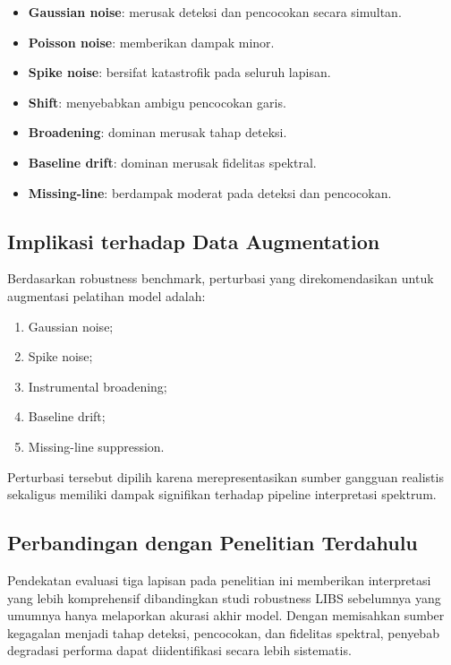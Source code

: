 \begin{itemize}
    \item \textbf{Gaussian noise}: merusak deteksi dan pencocokan secara simultan.
    \item \textbf{Poisson noise}: memberikan dampak minor.
    \item \textbf{Spike noise}: bersifat katastrofik pada seluruh lapisan.
    \item \textbf{Shift}: menyebabkan ambigu pencocokan garis.
    \item \textbf{Broadening}: dominan merusak tahap deteksi.
    \item \textbf{Baseline drift}: dominan merusak fidelitas spektral.
    \item \textbf{Missing-line}: berdampak moderat pada deteksi dan pencocokan.
\end{itemize}

\subsection{Implikasi terhadap Data Augmentation}

Berdasarkan robustness benchmark, perturbasi yang direkomendasikan untuk augmentasi pelatihan model adalah:

\begin{enumerate}
    \item Gaussian noise;
    \item Spike noise;
    \item Instrumental broadening;
    \item Baseline drift;
    \item Missing-line suppression.
\end{enumerate}

Perturbasi tersebut dipilih karena merepresentasikan sumber gangguan realistis sekaligus memiliki dampak signifikan terhadap pipeline interpretasi spektrum.

\subsection{Perbandingan dengan Penelitian Terdahulu}

Pendekatan evaluasi tiga lapisan pada penelitian ini memberikan interpretasi yang lebih komprehensif dibandingkan studi robustness LIBS sebelumnya yang umumnya hanya melaporkan akurasi akhir model. Dengan memisahkan sumber kegagalan menjadi tahap deteksi, pencocokan, dan fidelitas spektral, penyebab degradasi performa dapat diidentifikasi secara lebih sistematis.

